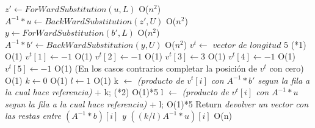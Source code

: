 \begin{itemize}
\begin{algorithm}[H]
\begin{algorithmic}[1]
\State $ z' \gets ForWardSubstitution(u, L)$ O($n^2$)
\State $ A^{-1}*u \gets BackWardSubstitution(z', U)$ O($n^2$)
\State $ y \gets ForWardSubstitution(b', L)$ O($n^2$)
\State $ A^{-1}*b' \gets BackWardSubstitution(y, U)$ O($n^2$)
\State $ v^t \gets$ $vector$ $de$ $longitud$ $5$ (*1) O(1)
        		\State $ v^t[1] \gets -1  $	O(1)	
	\EndIf
        		\State $ v^t[2] \gets -1  $ 	O(1)	
	\EndIf
			\State $ v^t[3] \gets 3  $ O(1)
        		\State $ v^t[4] \gets -1  $ 	O(1)	
	\EndIf
        		\State $ v^t[5] \gets -1  $ 	O(1)	
	\EndIf
	(En los casos contrarios completar la posición de $v^t$ con cero) O(1)
	 \State $ k \gets 0  $ 	O(1)
	 \State $ l \gets 1  $   O(1)
        		\State k $\gets$ \textit{(producto de $v^t[i]$ con $ A^{-1}*b'$ segun la fila a la cual hace referencia)} + k;	(*2)	 O(1)*5
        		\State l $\gets$ \textit{(producto de $v^t[i]$ con $A^{-1}*u$ segun la fila a la cual hace referencia)} + l; O(1)*5
	\EndIf
\EndFor
\State  Return \textit{devolver un vector con las restas entre  $(A^{-1}*b)[i]$ y  $((k/l)A^{-1}*u)[i]$}    O(n)


\end{algorithmic}
\end{algorithm}
\end{itemize}
